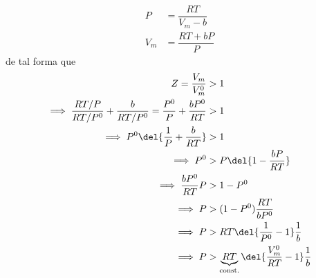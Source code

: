 \documentclass[border=5pt]{article}
\begin{document}
    \begin{align*}
        P&=\dfrac{RT}{V_m - b}\\
        V_m&=\dfrac{RT+bP}{P}
    \end{align*}
    de tal forma que
    \begin{align*}
        Z=\dfrac{V_m}{V_m^0}&>1\\ 
        \implies  \dfrac{RT/P}{RT/P^0} + \dfrac{b}{RT/P^0} =\dfrac{P^0}{P} + \dfrac{bP^0}{RT}&>1\\ 
        \implies P^0\del{\dfrac{1}{P} + \dfrac{b}{RT}}&>1\\
        \implies P^0 &> P\del{1- \dfrac{bP}{RT}} \\ 
        \implies \dfrac{bP^0}{RT}P &> 1 - P^0 \\
        \implies P &> (1 - P^0) \dfrac{RT}{bP^0}\\
        \implies P &> RT\del{\dfrac{1}{P^0} - 1}\dfrac{1}{b}\\
        \implies P &> \underbrace{RT}_\text{const.}\del{\dfrac{V_m^0}{RT} - 1}\dfrac{1}{b} \\ 
    \end{align*}
\end{document}

